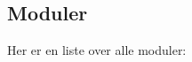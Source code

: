 \subsection{Moduler}
Her er en liste over alle moduler\+:\begin{DoxyCompactList}
\item {}
\end{DoxyCompactList}
